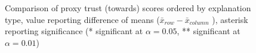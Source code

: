 \begin{figure}[H]
{\begin{minipage}[t]{0.65\textwidth}
			\caption{Comparison of proxy trust (towards) scores ordered by explanation type, value reporting difference of means ($\bar{x}_{row} - \bar{x}_{column}$ ), asterisk reporting significance (* significant at $\alpha=0.05$, ** significant at $\alpha=0.01$)}
			\label{fig:results_proxy_towards_reordered}
	\end{minipage}}
\end{figure}

